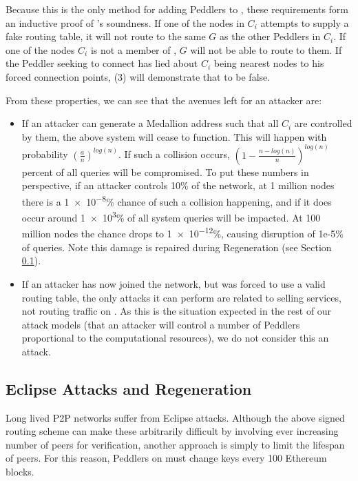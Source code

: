 Because this is the only method for adding Peddlers to \tOM{}, these requirements form an inductive proof of \tOM{}'s soundness. If one of the nodes in $C_i$ attempts to supply a fake routing table, it will not route to the same $G$ as the other Peddlers in $C_i$. If one of the nodes $C_i$ is not a member of \tOM{}, $G$ will not be able to route to them. If the Peddler seeking to connect has lied about $C_i$ being nearest nodes to his forced connection points, (3) will demonstrate that to be false.

From these properties, we can see that the avenues left for an attacker are:

\begin{itemize}
\item If an attacker can generate a Medallion address such that all $C_i$ are controlled by them, the above system will cease to function. This will happen with probability $(\frac{a}{n})^{log(n)}$. If such a collision occurs, $(1 - \frac{n-log(n)}{n})^{log(n)}$ percent of all queries will be compromised. To put these numbers in perspective, if an attacker controls 10\% of the network, at 1 million nodes there is a \num{1e-8}\% chance of such a collision happening, and if it does occur around \num{1e3}\% of all system queries will be impacted. At 100 million nodes the chance drops to \num{1e-12}\%, causing disruption of 1e-5\% of queries. Note this damage is repaired during Regeneration (see Section \ref{market-regen}).
\item If an attacker has now joined the network, but was forced to use a valid routing table, the only attacks it can perform are related to selling services, not routing traffic on \tOM{}. As this is the situation expected in the rest of our attack models (that an attacker will control a number of Peddlers proportional to the computational resources), we do not consider this an attack.
\end{itemize}

\subsection{Eclipse Attacks and Regeneration}
\label{market-regen}

Long lived P2P networks suffer from Eclipse attacks. Although the
above signed routing scheme can make these arbitrarily difficult by
involving ever increasing number of peers for verification, another
approach is simply to limit the lifespan of peers. For this reason,
Peddlers on \tOM{} must change keys every 100 Ethereum blocks.

